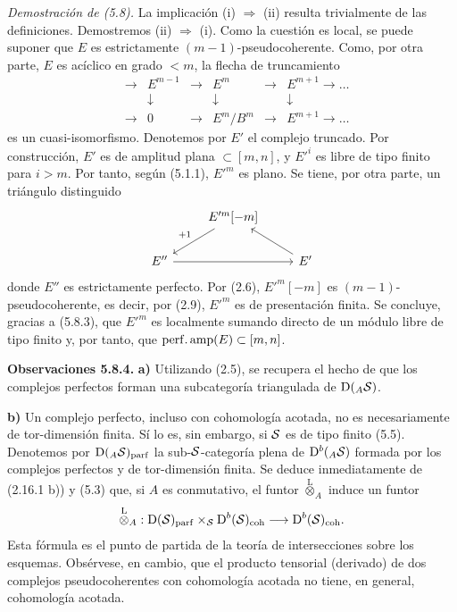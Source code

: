 \emph{Demostración de (5.8).} La implicación (i) \(\Rightarrow\) (ii) resulta trivialmente de las definiciones. Demostremos (ii) \(\Rightarrow\) (i). Como la cuestión es local, se puede suponer que \(E\) es estrictamente \((m-1)\)-pseudocoherente. Como, por otra parte, \(E\) es acíclico en grado \(<m\), la flecha de truncamiento
\[
\begin{array}{ccccccc}
&\to&E^{m-1}&\to&E^m&\to&E^{m+1}\to\ldots\\
&&\downarrow&&\downarrow&&\downarrow\\
&\to&0&\to&E^m/B^m&\to&E^{m+1}\to\ldots
\end{array}
\]
es un cuasi-isomorfismo. Denotemos por \(E'\) el complejo truncado. Por construcción, \(E'\) es de amplitud plana \(\subset[m,n]\), y \(E'^i\) es libre de tipo finito para \(i>m\). Por tanto, según (5.1.1), \(E'^m\) es plano. Se tiene, por otra parte, un triángulo distinguido
\[
\begin{tikzcd}
& E'^m[-m] \arrow[dl,"+1"'] & \\
E'' \arrow[rr] && E' \arrow[ul]
\end{tikzcd}
\]
donde \(E''\) es estrictamente perfecto. Por (2.6), \(E'^m[-m]\) es \((m-1)\)-pseudocoherente, es decir, por (2.9), \(E'^m\) es de presentación finita. Se concluye, gracias a (5.8.3), que \(E'^m\) es localmente sumando directo de un módulo libre de tipo finito y, por tanto, que \(\perfamp(E)\subset[m,n]\).

\textbf{Observaciones 5.8.4.} \textbf{a)} Utilizando (2.5), se recupera el hecho de que los complejos perfectos forman una subcategoría triangulada de \(\Dpx({}_A \sisi{S}{\mathcal S})\).

\textbf{b)} Un complejo perfecto, incluso con cohomología acotada, no es necesariamente de tor-dimensión finita. Sí lo es, sin embargo, si \(\sisi{S}{\mathcal S}\) es de tipo finito (5.5). Denotemos por \(\Dpx({}_A \sisi{S}{\mathcal S})_{\mathrm{parf}}\) la sub-\(\sisi{S}{\mathcal S}\)-categoría plena de \(\Dpx^b({}_A \sisi{S}{\mathcal S})\) formada por los complejos perfectos y de tor-dimensión finita. Se deduce inmediatamente de (2.16.1 b)) y (5.3) que, si \(A\) es conmutativo, el funtor \(\overset{\mathrm L}{\otimes}_A\) induce un funtor
\[
  \overset{\mathrm L}{\otimes}_A:
  \Dpx(\sisi{S}{\mathcal S})_{\mathrm{parf}}\times\sisi{_S}{_{\mathcal S}} \Dpx^b(\sisi{S}{\mathcal S})_{\mathrm{coh}}
  \longrightarrow \Dpx^b(\sisi{S}{\mathcal S})_{\mathrm{coh}}.
\]
Esta fórmula es el punto de partida de la teoría de intersecciones sobre los esquemas. Obsérvese, en cambio, que el producto tensorial (derivado) de dos complejos pseudocoherentes con cohomología acotada no tiene, en general, cohomología acotada.
